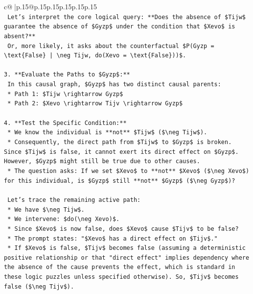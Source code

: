 \documentclass{article}
\begin{document}
{\begin{supertabular}{c@{$\;$}|p{.15\linewidth}@{}p{.15\linewidth}p{.15\linewidth}p{.15\linewidth}p{.15\linewidth}p{.15\linewidth}}
{{{\\ 
\texttt{    Let's interpret the core logical query: **Does the absence of \$Tijw\$ guarantee the absence of \$Gyzp\$ under the condition that \$Xevo\$ is absent?**} \\
\texttt{    Or, more likely, it asks about the counterfactual \$P(Gyzp = \textbackslash{}text\{False\} | \textbackslash{}neg Tijw, do(Xevo = \textbackslash{}text\{False\}))\$.} \\
\\ 
\texttt{3.  **Evaluate the Paths to \$Gyzp\$:**} \\
\texttt{    In this causal graph, \$Gyzp\$ has two distinct causal parents:} \\
\texttt{    *   Path 1: \$Tijw \textbackslash{}rightarrow Gyzp\$} \\
\texttt{    *   Path 2: \$Xevo \textbackslash{}rightarrow Tijv \textbackslash{}rightarrow Gyzp\$} \\
\\ 
\texttt{4.  **Test the Specific Condition:**} \\
\texttt{    *   We know the individual is **not** \$Tijw\$ (\$\textbackslash{}neg Tijw\$).} \\
\texttt{    *   Consequently, the direct path from \$Tijw\$ to \$Gyzp\$ is broken. Since \$Tijw\$ is false, it cannot exert its direct effect on \$Gyzp\$. However, \$Gyzp\$ might still be true due to other causes.} \\
\texttt{    *   The question asks: If we set \$Xevo\$ to **not** \$Xevo\$ (\$\textbackslash{}neg Xevo\$) for this individual, is \$Gyzp\$ still **not** \$Gyzp\$ (\$\textbackslash{}neg Gyzp\$)?} \\
\\ 
\texttt{    Let's trace the remaining active path:} \\
\texttt{    *   We have \$\textbackslash{}neg Tijw\$.} \\
\texttt{    *   We intervene: \$do(\textbackslash{}neg Xevo)\$.} \\
\texttt{    *   Since \$Xevo\$ is now false, does \$Xevo\$ cause \$Tijv\$ to be false?} \\
\texttt{        *   The prompt states: "\$Xevo\$ has a direct effect on \$Tijv\$."} \\
\texttt{        *   If \$Xevo\$ is false, \$Tijv\$ becomes false (assuming a deterministic positive relationship or that "direct effect" implies dependency where the absence of the cause prevents the effect, which is standard in these logic puzzles unless specified otherwise). So, \$Tijv\$ becomes false (\$\textbackslash{}neg Tijv\$).} \\
}}}
\end{supertabular}}
\end{document}
